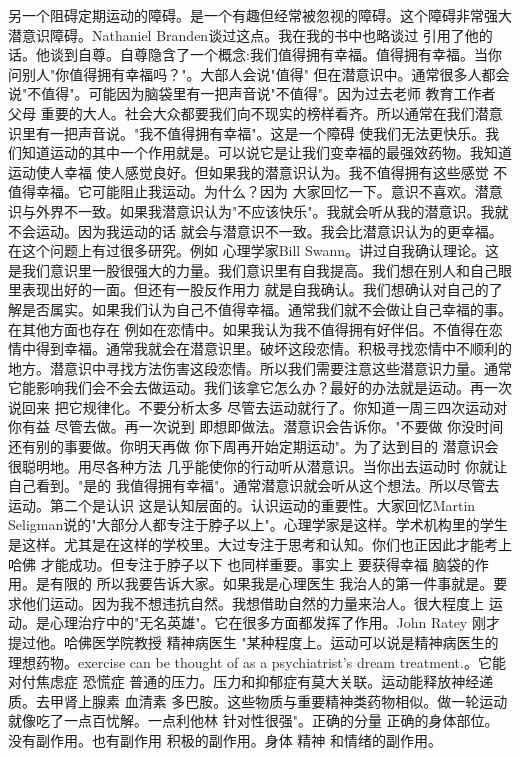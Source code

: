 另一个阻碍定期运动的障碍。是一个有趣但经常被忽视的障碍。这个障碍非常强大 潜意识障碍。Nathaniel Branden谈过这点。我在我的书中也略谈过 引用了他的话。他谈到自尊。自尊隐含了一个概念:我们值得拥有幸福。值得拥有幸福。当你问别人"你值得拥有幸福吗？"。大部人会说"值得" 但在潜意识中。通常很多人都会说"不值得"。可能因为脑袋里有一把声音说"不值得"。因为过去老师 教育工作者 父母 重要的大人。社会大众都要我们向不现实的榜样看齐。所以通常在我们潜意识里有一把声音说。"我不值得拥有幸福"。这是一个障碍 使我们无法更快乐。我们知道运动的其中一个作用就是。可以说它是让我们变幸福的最强效药物。我知道运动使人幸福 使人感觉良好。但如果我的潜意识认为。我不值得拥有这些感觉 不值得幸福。它可能阻止我运动。为什么？因为 大家回忆一下。意识不喜欢。潜意识与外界不一致。如果我潜意识认为"不应该快乐"。我就会听从我的潜意识。我就不会运动。因为我运动的话 就会与潜意识不一致。我会比潜意识认为的更幸福。在这个问题上有过很多研究。例如 心理学家Bill Swann。讲过自我确认理论。这是我们意识里一股很强大的力量。我们意识里有自我提高。我们想在别人和自己眼里表现出好的一面。但还有一股反作用力 就是自我确认。我们想确认对自己的了解是否属实。如果我们认为自己不值得幸福。通常我们就不会做让自己幸福的事。在其他方面也存在 例如在恋情中。如果我认为我不值得拥有好伴侣。不值得在恋情中得到幸福。通常我就会在潜意识里。破坏这段恋情。积极寻找恋情中不顺利的地方。潜意识中寻找方法伤害这段恋情。所以我们需要注意这些潜意识力量。通常它能影响我们会不会去做运动。我们该拿它怎么办？最好的办法就是运动。再一次说回来 把它规律化。不要分析太多 尽管去运动就行了。你知道一周三四次运动对你有益 尽管去做。再一次说到 即想即做法。潜意识会告诉你。"不要做 你没时间 还有别的事要做。你明天再做 你下周再开始定期运动"。为了达到目的 潜意识会很聪明地。用尽各种方法 几乎能使你的行动听从潜意识。当你出去运动时 你就让自己看到。"是的 我值得拥有幸福"。通常潜意识就会听从这个想法。所以尽管去运动。第二个是认识 这是认知层面的。认识运动的重要性。大家回忆Martin Seligman说的"大部分人都专注于脖子以上"。心理学家是这样。学术机构里的学生是这样。尤其是在这样的学校里。大过专注于思考和认知。你们也正因此才能考上哈佛 才能成功。但专注于脖子以下 也同样重要。事实上 要获得幸福 脑袋的作用。是有限的 所以我要告诉大家。如果我是心理医生 我治人的第一件事就是。要求他们运动。因为我不想违抗自然。我想借助自然的力量来治人。很大程度上 运动。是心理治疗中的"无名英雄"。它在很多方面都发挥了作用。John Ratey 刚才提过他。哈佛医学院教授 精神病医生 "某种程度上。运动可以说是精神病医生的理想药物。exercise can be thought of as a psychiatrist’s dream treatment.。它能对付焦虑症 恐慌症 普通的压力。压力和抑郁症有莫大关联。运动能释放神经递质。去甲肾上腺素 血清素 多巴胺。这些物质与重要精神类药物相似。做一轮运动就像吃了一点百忧解。一点利他林 针对性很强"。正确的分量 正确的身体部位。没有副作用。也有副作用 积极的副作用。身体 精神 和情绪的副作用。 

